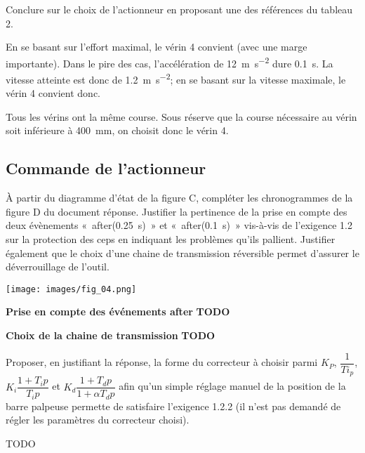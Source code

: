 \documentclass[11pt]{article}
\begin{document}
\UPSTIquestion  Conclure sur le choix de l’actionneur en proposant une des références du tableau 2.

\begin{UPSTIcorrige}
En se basant sur l'effort maximal, le vérin 4 convient (avec une marge importante).  Dans le pire des cas, l'accélération de \SI{12}{m.s^{-2}} dure \SI{0,1}{s}. La vitesse atteinte est donc de \SI{1,2}{m.s^{-2}}; en se basant sur la vitesse maximale, le vérin 4 convient donc. 

Tous les vérins ont la même course. Sous réserve que la course nécessaire au vérin soit inférieure à \SI{400}{mm}, on choisit donc le vérin 4. 
\end{UPSTIcorrige}

\subsection{Commande de l’actionneur}

\UPSTIquestion  À partir du diagramme d’état de la figure C, compléter les chronogrammes de la figure D du document réponse. Justifier la pertinence de la prise en compte des deux évènements «~after(\SI{0,25}{s})~» et «~after(\SI{0,1}{s})~» vis-à-vis de l’exigence 1.2 sur la protection des ceps en indiquant les problèmes qu’ils pallient. Justifier également que le choix d’une chaine de transmission réversible permet d’assurer le déverrouillage de l’outil.

\begin{UPSTIcorrige}
\begin{center}
\texttt{[image: images/fig\_04.png]}
\end{center}

\textbf{Prise en compte des événements after}
\textbf{TODO}

\textbf{Choix de la chaine de transmission}
\textbf{TODO}


\end{UPSTIcorrige}





\UPSTIquestion  Proposer, en justifiant la réponse, la forme du correcteur à choisir parmi $K_P$, $\dfrac{1}{Ti_p}$, $K_i \dfrac{1+T_i p}{T_i p}$ et $K_d \dfrac{1+T_d p}{1+\alpha T_d p}$ afin qu’un simple réglage manuel de la position de la barre palpeuse permette de satisfaire l’exigence 1.2.2 (il n’est pas demandé de régler les paramètres du correcteur choisi).
\begin{UPSTIcorrige}
TODO
\end{UPSTIcorrige}
\end{document}
